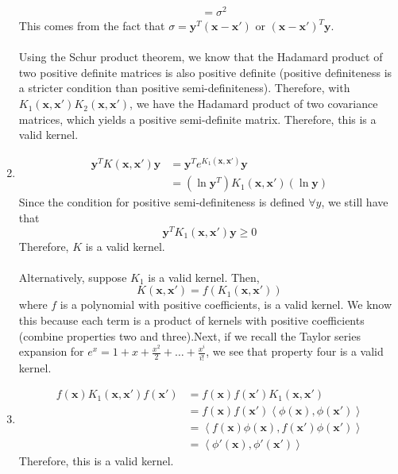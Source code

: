 \documentclass[submit]{harvardml}
\newcommand{\mbf}[1]{\mathbf{#1}}
\begin{document}
\begin{enumerate}
\begin{align*}
			&= \sigma^2
		\end{align*}
		This comes from the fact that $\sigma = \mbf{y}^T (\mbf{x} - \mbf{x'})$ or $(\mbf{x} -\mbf{x'})^T \mbf{y}$. \\ \\
		Using the Schur product theorem, we know that the Hadamard product of two positive definite matrices is also 
		positive definite (positive definiteness is a stricter condition than positive semi-definiteness). Therefore, 
		with $K_1(\mbf{x},\mbf{x'})K_2(\mbf{x},\mbf{x'})$, we have the Hadamard product of two covariance 
		matrices, which yields a positive semi-definite matrix. Therefore, this is a valid kernel.
	\item 
		\begin{align*}
			\mbf{y}^T K(\mbf{x},\mbf{x'}) \mbf{y} &= \mbf{y}^T e^{K_1(\mbf{x},\mbf{x'})} \mbf{y} \\
			&= (\ln \mbf{y}^T) K_1(\mbf{x},\mbf{x'}) (\ln \mbf{y})
		\end{align*}
		Since the condition for positive semi-definiteness is defined $\forall y$, we still have that 
			$$\mbf{y}^T K_1(\mbf{x},\mbf{x'}) \mbf{y} \geq 0$$
		Therefore, $K$ is a valid kernel.	\\ \\
		Alternatively, suppose $K_1$ is a valid kernel. Then,
			$$K(\mbf{x}, \mbf{x'}) = f(K_1(\mbf{x},\mbf{x'}))$$
		where $f$ is a polynomial with positive coefficients, is a valid kernel. We know this because each term 
		is a product of kernels with positive coefficients	(combine properties two and three).Next, if we 
		recall the Taylor series expansion for $e^x = 1 + x + \frac{x^2}{2} + \dots + \frac{x^i}{i!}$, we see 
		that property four is a valid kernel.
	\item 
		\begin{align*}
			f(\mbf{x}) K_1(\mbf{x},\mbf{x'}) f(\mbf{x'}) &= f(\mbf{x}) f(\mbf{x'}) K_1(\mbf{x},\mbf{x'}) \\
			&= f(\mbf{x}) f(\mbf{x'}) \left<\phi(\mbf{x}), \phi(\mbf{x'}) \right>\\
			&=  \left<f(\mbf{x}) \phi(\mbf{x}), f(\mbf{x'}) \phi(\mbf{x'}) \right>\\
			&= \left<\phi' (\mbf{x}), \phi'(\mbf{x'}) \right>
		\end{align*}
		Therefore, this is a valid kernel.
\end{enumerate}
\end{document}
